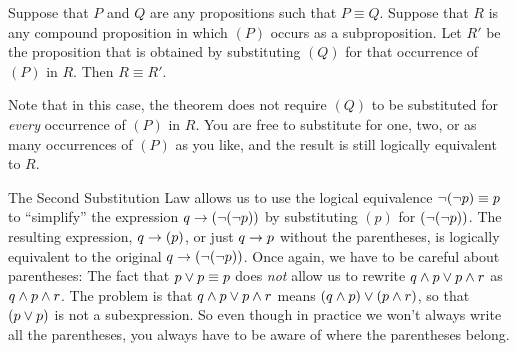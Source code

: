 \begin{theorem}\label{T-sub2}
Suppose that $P$ and $Q$ are any propositions such that $P\equiv Q$.
Suppose that $R$ is any compound proposition in which $(P)$
occurs as a subproposition.  Let $R'$ be the proposition that is
obtained by substituting $(Q)$ for that occurrence of $(P)$ in $R$.
Then $R\equiv R'$.
\end{theorem}

Note that in this case, the theorem does not require $(Q)$ to be
substituted for \emph{every} occurrence of $(P)$ in $R$.  You are free
to substitute for one, two, or as many occurrences of $(P)$ as you like,
and the result is still logically equivalent to $R$.

The Second Substitution Law allows us to use the 
logical equivalence $\lnot(\lnot p)\equiv p$ to
``simplify'' the expression $q\rightarrow (\lnot(\lnot p))$ by substituting
$(p)$ for $(\lnot(\lnot p))$.  The resulting expression, $q\rightarrow(p)$,
or just $q \rightarrow p$ without the parentheses,
is logically equivalent to the original $q\rightarrow (\lnot(\lnot p))$.
Once again, we have to be careful about parentheses:  The fact that
$p\vee p\equiv p$ does \emph{not} allow us to rewrite $q\wedge p\vee p\wedge r$
as $q\wedge p\wedge r$.  The problem is that $q\wedge p\vee p\wedge r$
means $(q\wedge p)\vee (p\wedge r)$, so that $(p\vee p)$ is not a subexpression.
So even though in practice we won't always write all the parentheses,
you always have to be aware of where the parentheses belong.


